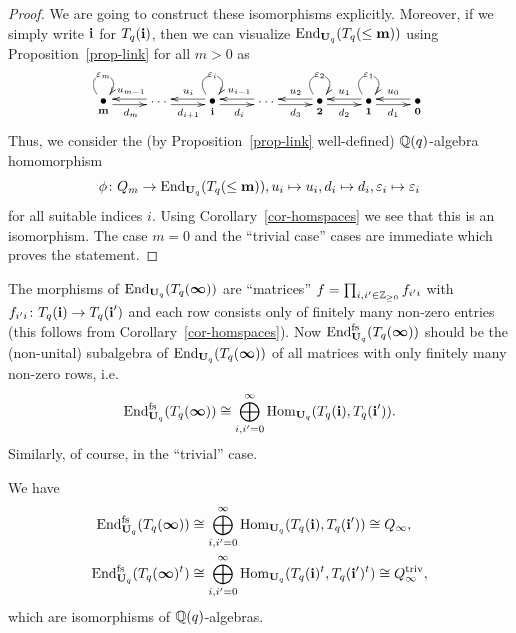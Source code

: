 \begin{proof}
We are going to construct these 
isomorphisms explicitly. Moreover, 
if we simply write $\boldsymbol{\mathrm{i}}$ for $T_q({\boldsymbol{\mathrm{i}}})$, 
then we can visualize $\mathrm{End}_{\boldsymbol{\mathrm{U}}_q}(T_q({\leq\boldsymbol{\mathrm{m}}}))$ 
using Proposition~\ref{prop-link} for all $m>0$ as
\[
\xymatrix{
  \raisebox{0.1cm}{\xy(0,0)*{\bullet};(0,-2.5)*{\scriptstyle \bbm};\endxy} \ar@(ul,ur)|{\varepsilon_m} \ar@<-2pt>[r]_{d_{m}} & \cdots \ar@<-2pt>[l]_{u_{m-1}}\ar@<-2pt>[r]_/+0.2em/{d_{i+1}} &  \raisebox{0.1cm}{\xy(0,0)*{\bullet};(0,-2.5)*{\scriptstyle \bbi};\endxy} \ar@(ul,ur)|{\varepsilon_i} \ar@<-2pt>[l]_/-0.2em/{u_{i}}\ar@<-2pt>[r]_{d_{i}} & \cdots \ar@<-2pt>[l]_{u_{i-1}}\ar@<-2pt>[r]_/+0.2em/{d_{3}} & \raisebox{0.1cm}{\xy(0,0)*{\bullet};(0,-2.5)*{\scriptstyle \bbt};\endxy} \ar@(ul,ur)|{\varepsilon_2} \ar@<-2pt>[l]_/-0.2em/{u_{2}}\ar@<-2pt>[r]_{d_{2}} & \raisebox{0.1cm}{\xy(0,0)*{\bullet};(0,-2.5)*{\scriptstyle \bbo};\endxy} \ar@(ul,ur)|{\varepsilon_1} \ar@<-2pt>[l]_{u_{1}}\ar@<-2pt>[r]_{d_{1}} & \raisebox{0.1cm}{\xy(0,0)*{\bullet};(0,-2.5)*{\scriptstyle \bbz};\endxy}  \ar@<-2pt>[l]_{u_0}\\
}
\]
Thus, we consider the 
(by Proposition~\ref{prop-link} well-defined) $\mathbb{Q}(q)$-algebra homomorphism
\[
\phi\colon Q_{m}\to\mathrm{End}_{\boldsymbol{\mathrm{U}}_q}(T_q({\leq\boldsymbol{\mathrm{m}}})), u_i\mapsto u_i, d_i\mapsto d_i,\varepsilon_i\mapsto \varepsilon_i
\]
for all suitable indices $i$. 
Using Corollary~\ref{cor-homspaces} 
we see that this is an isomorphism. 
The case $m=0$ and the 
``trivial case'' cases are immediate which proves the statement.
\end{proof}



The morphisms of $\mathrm{End}_{\boldsymbol{\mathrm{U}}_q}(T_q({\boldsymbol{\infty}}))$ are 
``matrices'' $f=\prod_{i,i^{\prime}\in\mathbb{Z}_{\geq 0}} f_{i^{\prime}i}$ 
with $f_{i^{\prime}i}\colon T_q({\boldsymbol{\mathrm{i}}})\to T_q({\boldsymbol{\mathrm{i}}^{\prime}})$ and each 
row consists only of finitely many non-zero entries 
(this follows from Corollary~\ref{cor-homspaces}). 
Now $\mathrm{End}^{\mathrm{fs}}_{\boldsymbol{\mathrm{U}}_q}(T_q({\boldsymbol{\infty}}))$ should be the 
(non-unital) subalgebra of $\mathrm{End}_{\boldsymbol{\mathrm{U}}_q}(T_q({\boldsymbol{\infty}}))$ 
of all matrices with only finitely many non-zero rows, i.e.
\[
\mathrm{End}^{\mathrm{fs}}_{\boldsymbol{\mathrm{U}}_q}(T_q({\boldsymbol{\infty}}))\cong \bigoplus_{i,i^{\prime}=0}^{\infty} \mathrm{Hom}_{\boldsymbol{\mathrm{U}}_q}(T_q({\boldsymbol{\mathrm{i}}}),T_q({\boldsymbol{\mathrm{i}}^{\prime}})).
\]
Similarly, of course, in the ``trivial'' case.



\begin{prop}\label{prop-isoofalg2}
We have
\begin{gather*}
\begin{aligned}
\mathrm{End}^{\mathrm{fs}}_{\boldsymbol{\mathrm{U}}_q}(T_q({\boldsymbol{\infty}}))&\cong\bigoplus_{i,i^{\prime}=0}^{\infty}\mathrm{Hom}_{\boldsymbol{\mathrm{U}}_q}(T_q({\boldsymbol{\mathrm{i}}}),T_q({\boldsymbol{\mathrm{i}}^{\prime}}))\cong Q_{\infty},
\\
\mathrm{End}^{\mathrm{fs}}_{\boldsymbol{\mathrm{U}}_q}(T_q({\boldsymbol{\infty}})^t)&\cong\bigoplus_{i,i^{\prime}=0}^{\infty}\mathrm{Hom}_{\boldsymbol{\mathrm{U}}_q}(T_q({\boldsymbol{\mathrm{i}}})^t,T_q({\boldsymbol{\mathrm{i}}^{\prime}})^t)\cong Q_{\infty}^{\mathrm{triv}},
\end{aligned}
\end{gather*}
which are isomorphisms of $\mathbb{Q}(q)$-algebras.\makeqed
\end{prop}



